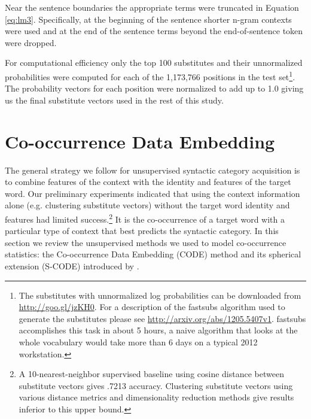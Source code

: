 \documentclass[11pt]{article}
\begin{document}
Near the sentence boundaries the appropriate terms were truncated in
Equation \ref{eq:lm3}.  Specifically, at the beginning of the sentence
shorter n-gram contexts were used and at the end of the sentence terms
beyond the end-of-sentence token were dropped.

For computational efficiency only the top 100 substitutes and their
unnormalized probabilities were computed for each of the 1,173,766
positions in the test set\footnote{The substitutes with unnormalized
  log probabilities can be downloaded from \mbox{\url{http://goo.gl/jzKH0}}.
  For a description of the {\sc fastsubs} algorithm used to generate
  the substitutes please see \mbox{\url{http://arxiv.org/abs/1205.5407v1}}.
  {\sc fastsubs} accomplishes this task in about 5 hours, a naive
  algorithm that looks at the whole vocabulary would take more than 6
  days on a typical 2012 workstation.}.  The probability vectors for
each position were normalized to add up to 1.0 giving us the final
substitute vectors used in the rest of this study.


\section{Co-occurrence Data Embedding}
\label{sec:code}

The general strategy we follow for unsupervised syntactic category
acquisition is to combine features of the context with the identity
and features of the target word.  Our preliminary experiments
indicated that using the context information alone (e.g. clustering
substitute vectors) without the target word identity and features had
limited success.\footnote{A 10-nearest-neighbor supervised baseline
  using cosine distance between substitute vectors gives .7213
  accuracy.  Clustering substitute vectors using various distance
  metrics and dimensionality reduction methods give results inferior
  to this upper bound.} It is the co-occurrence of a target word with a
particular type of context that best predicts the syntactic category.
In this section we review the unsupervised methods we used to model
co-occurrence statistics: the Co-occurrence Data Embedding (CODE)
method \cite{globerson2007euclidean} and its spherical extension
(S-CODE) introduced by \cite{maron2010sphere}.
\end{document}
